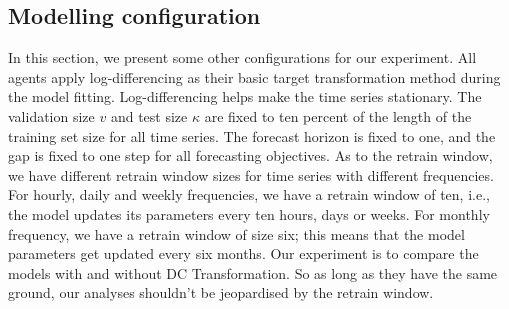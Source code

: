 \subsection{Modelling configuration}
In this section, we present some other configurations for our experiment. All agents apply log-differencing as their basic target transformation method during the model fitting. Log-differencing helps make the time series stationary. The validation size $v$ and test size $\kappa$ are fixed to ten percent of the length of the training set size for all time series. The forecast horizon is fixed to one, and the gap is fixed to one step for all forecasting objectives. As to the retrain window, we have different retrain window sizes for time series with different frequencies. For hourly, daily and weekly frequencies, we have a retrain window of ten, i.e., the model updates its parameters every ten hours, days or weeks. For monthly frequency, we have a retrain window of size six; this means that the model parameters get updated every six months. Our experiment is to compare the models with and without DC Transformation. So as long as they have the same ground, our analyses shouldn't be jeopardised by the retrain window.
